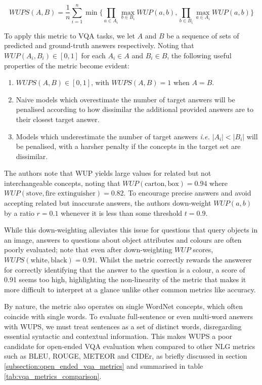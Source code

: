 \begin{equation}
    WUPS(A, B) = \frac{1}{n} \sum_{i=1}^n \min \{\prod_{a \in A_i} \max_{b \in B_i} WUP(a, b), \prod_{b \in B_i} \max_{a \in A_i} WUP(a, b)\}
    \label{eq:wups}
\end{equation}

To apply this metric to VQA tasks, we let \(A\) and \(B\) be a sequence of sets of predicted and ground-truth answers respectively. Noting that \(WUP(A_i, B_i) \in [0, 1]\) for each \(A_i \in A\) and \(B_i \in B\), the following useful properties of the metric become evident:

\begin{enumerate}
    \item \(WUPS(A, B) \in [0, 1]\), with \(WUPS(A, B) = 1\) when \(A = B\).
    \item Naive models which overestimate the number of target answers will be penalised according to how dissimilar the additional provided answers are to their closest target answer.
    \item Models which underestimate the number of target answers \textit{i.e.} \(|A_i| < |B_i|\) will be penalised, with a harsher penalty if the concepts in the target set are dissimilar.
\end{enumerate}

The authors note that WUP yields large values for related but not interchangeable concepts, noting that \(WUP(\text{carton}, \text{box}) = 0.94\) where \(WUP(\text{stove}, \text{fire extinguisher}) = 0.82\). To encourage precise answers and avoid accepting related but inaccurate answers, the authors down-weight \(WUP(a, b)\) by a ratio \(r = 0.1\) whenever it is less than some threshold \(t = 0.9\).

While this down-weighting alleviates this issue for questions that query objects in an image, answers to questions about object attributes and colours are often poorly evaluated; \citeauthor{kafle2017visual} note that even after down-weighting \(WUP\) scores, \(WUPS(\text{white}, \text{black}) = 0.91\). Whilst the metric correctly rewards the answerer for correctly identifying that the answer to the question is a colour, a score of 0.91 seems too high, highlighting the non-linearity of the metric that makes it more difficult to interpret at a glance unlike other common metrics like accuracy.

By nature, the metric also operates on single WordNet concepts, which often coincide with single words. To evaluate full-sentence or even multi-word answers with WUPS, we must treat sentences as a set of distinct words, disregarding essential syntactic and contextual information. This makes WUPS a poor candidate for open-ended VQA evaluation when compared to other NLG metrics such as BLEU, ROUGE, METEOR and CIDEr, as briefly discussed in section \ref{subsection:open_ended_vqa_metrics} and summarised in table \ref{tab:vqa_metrics_comparison}.

